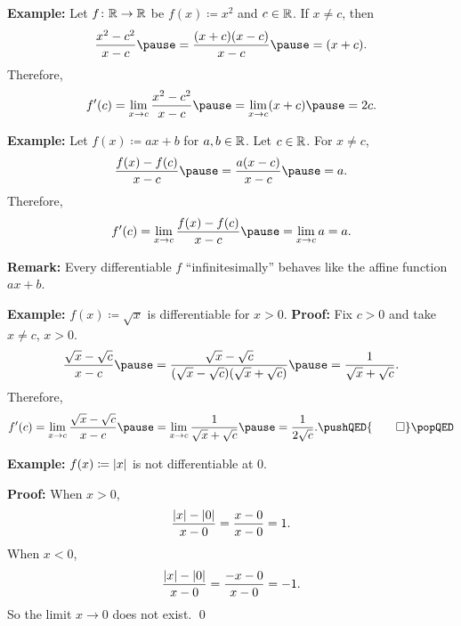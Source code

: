 \documentclass[10pt,aspectratio=169]{beamer}
\begin{document}
\begin{frame}
\textbf{Example:}
Let $f \colon {\mathbb{R}} \to {\mathbb{R}}$ be $f(x) \coloneqq x^2$ and $c \in {\mathbb{R}}$.
\pause
If $x \not= c$, then
\begin{equation*}
\frac{x^2-c^2}{x-c}
\pause
=
\frac{(x+c)(x-c)}{x-c}
\pause
=
(x+c) .
\end{equation*}
\pause
Therefore,
\begin{equation*}
f'(c)
= 
\lim_{x\to c} \frac{x^2-c^2}{x-c}
\pause
=
\lim_{x\to c} (x+c)
\pause
= 2c.
\end{equation*}

\pause
\medskip

\textbf{Example:}
Let $f(x) \coloneqq ax + b$ for $a, b \in {\mathbb{R}}$.
\pause
Let $c \in {\mathbb{R}}$.
\pause
For $x \not=c$,
\begin{equation*}
\frac{f(x)-f(c)}{x-c}
\pause
=
\frac{a(x-c)}{x-c}
\pause
= a .
\end{equation*}
\pause
Therefore,
\begin{equation*}
f'(c)
=
\lim_{x\to c} 
\frac{f(x)-f(c)}{x-c}
\pause
=
\lim_{x\to c} 
a
= a.
\end{equation*}

\pause

\textbf{Remark:}
Every differentiable $f$ ``infinitesimally'' behaves like
the affine function $ax + b$.

\end{frame}

\begin{frame}

\textbf{Example:}
$f(x) \coloneqq \sqrt{x}$ is differentiable for $x > 0$.
\pause
\textbf{Proof:}
Fix $c > 0$ and take $x \not= c$, $x > 0$.
\pause
\begin{equation*}
\frac{\sqrt{x}-\sqrt{c}}{x-c}
\pause
=
\frac{\sqrt{x}-\sqrt{c}}{(\sqrt{x}-\sqrt{c})(\sqrt{x}+\sqrt{c})}
\pause
=
\frac{1}{\sqrt{x}+\sqrt{c}} .
\end{equation*}
\pause
Therefore,
\begin{equation*}
f'(c)
=
\lim_{x\to c}
\frac{\sqrt{x}-\sqrt{c}}{x-c}
\pause
=
\lim_{x\to c}
\frac{1}{\sqrt{x}+\sqrt{c}}
\pause
=
\frac{1}{2\sqrt{c}} .
\pushQED{\qed}
\qedhere
\popQED
\end{equation*}

\pause
\medskip

\textbf{Example:}
$f(x) \coloneqq \left\lvert {x} \right\rvert$ is not differentiable at $0$.

\pause
\textbf{Proof:}
When $x > 0$,
\begin{equation*}
\frac{\left\lvert {x} \right\rvert-\left\lvert {0} \right\rvert}{x-0} =
\frac{x-0}{x-0} = 1 .
\end{equation*}
\pause
When $x < 0$,
\begin{equation*}
\frac{\left\lvert {x} \right\rvert-\left\lvert {0} \right\rvert}{x-0} =
\frac{-x-0}{x-0} = -1 .
\end{equation*}
\pause
So the limit $x \to 0$ does not exist. \qed

\end{frame}
\end{document}
